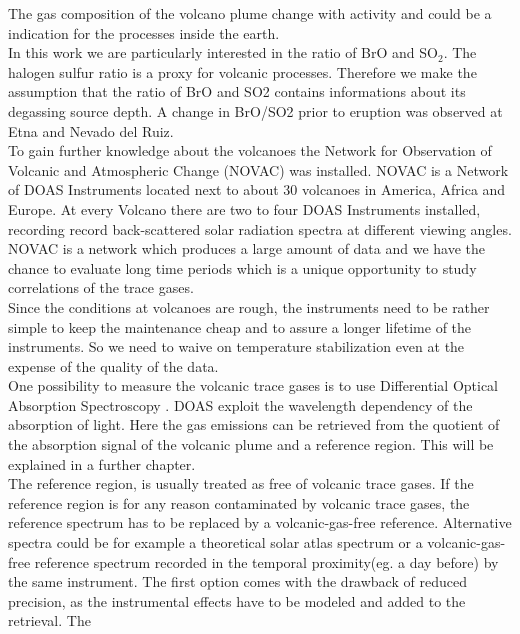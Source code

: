 %
The gas composition of the volcano plume change with activity and could be a indication for the processes inside the earth.\\ 
%
In this work we are particularly interested in the ratio of BrO and SO$_2$. The halogen sulfur ratio is a proxy for volcanic processes. Therefore we make the assumption
that the ratio of BrO and SO2 contains informations about its degassing source depth. A change in BrO/SO2 prior to eruption was observed at Etna and Nevado del Ruiz.\\
%
\newline
%
To gain further knowledge about the volcanoes the Network for Observation of Volcanic and Atmospheric Change (NOVAC) was installed. NOVAC is a Network of DOAS Instruments located next to about 30 volcanoes in America, Africa and Europe. At every Volcano there are two to four DOAS Instruments installed, recording record back-scattered solar radiation spectra at different viewing angles.\\
NOVAC is a network which produces a large amount of data and we have the chance to evaluate long time periods which is a unique opportunity to study correlations of the trace gases.\\
Since the conditions at volcanoes are rough, the instruments need to be rather simple to keep the maintenance cheap and to assure a longer lifetime of the instruments. So we need to waive on temperature stabilization even at the expense of the quality of the data.\\
%
\newline
%
One possibility to measure the volcanic trace gases is to use Differential Optical Absorption Spectroscopy \cite{platt2008differential}. DOAS exploit the wavelength dependency of the absorption of light. Here the gas emissions can be retrieved
from the quotient of the absorption signal of the volcanic plume and a
reference region. This will be explained in a further chapter.\\
%
\newline
%
The reference region, is usually treated as free of
volcanic trace gases. If the reference region is for any reason
contaminated by volcanic trace gases, the reference spectrum has to be
replaced by a volcanic-gas-free reference. Alternative spectra could be for example a
theoretical solar atlas spectrum or a volcanic-gas-free reference
spectrum recorded in the temporal proximity(eg. a day before) by the same instrument. 
The first option comes with the drawback of reduced precision, as the
instrumental effects have to be modeled and added to the retrieval. The
